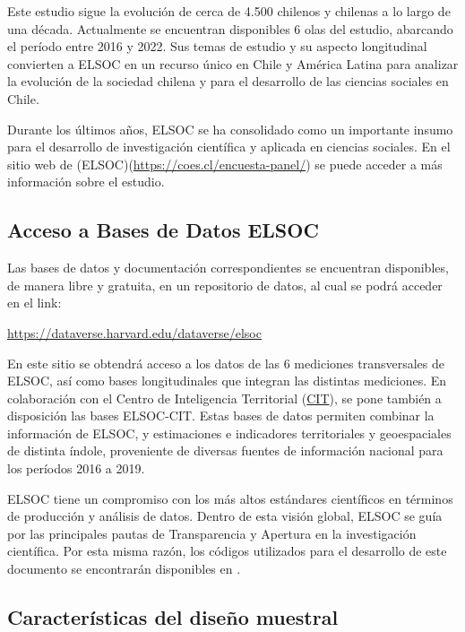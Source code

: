 \documentclass[
  12pt,
]{book}
\begin{document}
Este estudio sigue la evolución de cerca de 4.500 chilenos y chilenas a lo largo de una década. Actualmente se encuentran disponibles 6 olas del estudio, abarcando el período entre 2016 y 2022. Sus temas de estudio y su aspecto longitudinal convierten a ELSOC en un recurso único en Chile y América Latina para analizar la evolución de la sociedad chilena y para el desarrollo de las ciencias sociales en Chile.

Durante los últimos años, ELSOC se ha consolidado como un importante insumo para el desarrollo de investigación científica y aplicada en ciencias sociales. En el sitio web de (ELSOC)(\url{https://coes.cl/encuesta-panel/}) se puede acceder a más información sobre el estudio.

\hypertarget{acceso-a-bases-de-datos-elsoc}{%
\subsection*{Acceso a Bases de Datos ELSOC}\label{acceso-a-bases-de-datos-elsoc}}

Las bases de datos y documentación correspondientes se encuentran disponibles, de manera libre y gratuita, en un repositorio de datos, al cual se podrá acceder en el link:

\url{https://dataverse.harvard.edu/dataverse/elsoc}

En este sitio se obtendrá acceso a los datos de las 6 mediciones transversales de ELSOC, así como bases longitudinales que integran las distintas mediciones. En colaboración con el Centro de Inteligencia Territorial (\href{https://cit.uai.cl/}{CIT}), se pone también a disposición las bases ELSOC-CIT. Estas bases de datos permiten combinar la información de ELSOC, y estimaciones e indicadores territoriales y geoespaciales de distinta índole, proveniente de diversas fuentes de información nacional para los períodos 2016 a 2019.

ELSOC tiene un compromiso con los más altos estándares científicos en términos de producción y análisis de datos. Dentro de esta visión global, ELSOC se guía por las principales pautas de Transparencia y Apertura en la investigación científica. Por esta misma razón, los códigos utilizados para el desarrollo de este documento se encontrarán disponibles en .

\hypertarget{caracteruxedsticas-del-diseuxf1o-muestral}{%
\subsection*{Características del diseño muestral}\label{caracteruxedsticas-del-diseuxf1o-muestral}}
\end{document}

